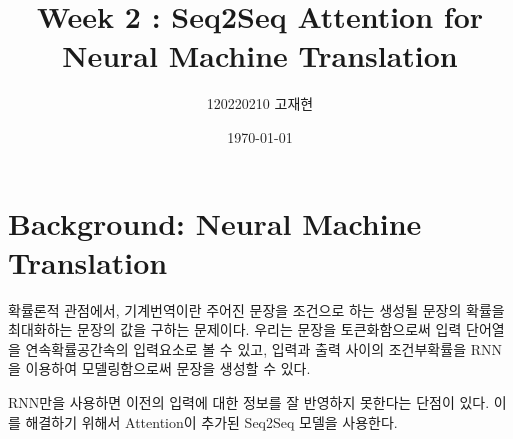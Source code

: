 \documentclass[
	11pt,
	a4paper,
	figtabcapt,
]{oblivoir}
\title{\vspace{-4cm}Week 2 : Seq2Seq Attention for Neural Machine Translation}
\author{120220210 고재현}
\date{\today}
\begin{document}


\maketitle



\setcounter{table}{0}		                    %
\setcounter{figure}{0}		                    %



\section{Background: Neural Machine Translation}
확률론적 관점에서,
기계번역이란 주어진 문장을 조건으로 하는 생성될 문장의 확률을 최대화하는 문장의 값을 구하는 문제이다.
우리는 문장을 토큰화함으로써 입력 단어열을 연속확률공간속의 입력요소로 볼 수 있고,
입력과 출력 사이의 조건부확률을 RNN을 이용하여 모델링함으로써 문장을 생성할 수 있다.

RNN만을 사용하면 이전의 입력에 대한 정보를 잘 반영하지 못한다는 단점이 있다.
이를 해결하기 위해서 Attention이 추가된 Seq2Seq 모델을 사용한다.


\clearpage
\end{document}

